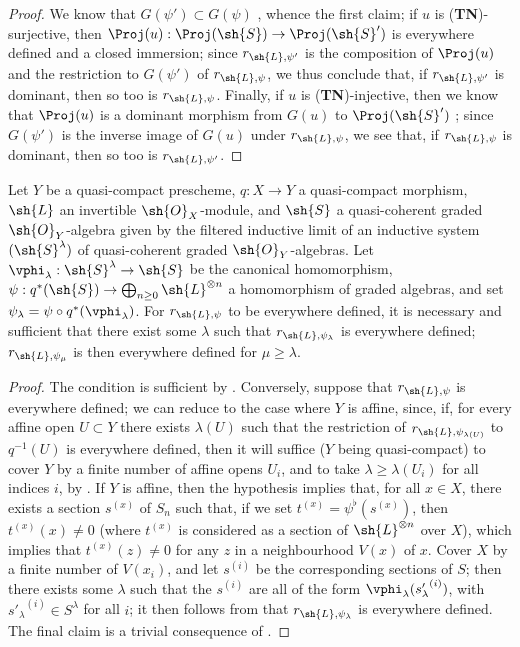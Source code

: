 \begin{proof}
We know that $G(\psi')\subset G(\psi)$ , whence the first claim;
if $u$ is (\textbf{TN})-surjective, then $\Proj(u):\Proj(\sh{S})\to\Proj(\sh{S}')$ is everywhere defined and a closed immersion;
since $r_{\sh{L},\psi'}$ is the composition of $\Proj(u)$ and the restriction to $G(\psi')$ of $r_{\sh{L},\psi}$, we thus conclude that, if $r_{\sh{L},\psi'}$ is dominant, then so too is $r_{\sh{L},\psi}$.
Finally, if $u$ is (\textbf{TN})-injective, then we know that $\Proj(u)$ is a dominant morphism from $G(u)$ to $\Proj(\sh{S}')$ ;
since $G(\psi')$ is the inverse image of $G(u)$ under $r_{\sh{L},\psi}$, we see that, if $r_{\sh{L},\psi}$ is dominant, then so too is $r_{\sh{L},\psi'}$.
\end{proof}

\begin{proposition}[3.7.7]
\label{II.3.7.7}
Let $Y$ be a quasi-compact prescheme, $q:X\to Y$ a quasi-compact morphism, $\sh{L}$ an invertible $\sh{O}_X$-module, and $\sh{S}$ a quasi-coherent graded $\sh{O}_Y$-algebra given by the filtered inductive limit of an inductive system $(\sh{S}^\lambda)$ of quasi-coherent graded $\sh{O}_Y$-algebras.
Let $\vphi_\lambda:\sh{S}^\lambda\to\sh{S}$ be the canonical homomorphism, $\psi:q^*(\sh{S})\to\bigoplus_{n\geq0}\sh{L}^{\otimes n}$ a homomorphism of graded algebras, and set $\psi_\lambda=\psi\circ q^*(\vphi_\lambda)$.
For $r_{\sh{L},\psi}$ to be everywhere defined, it is necessary and sufficient that there exist some $\lambda$ such that $r_{\sh{L},\psi_\lambda}$ is everywhere defined;
$r_{\sh{L},\psi_\mu}$ is then everywhere defined for $\mu\geq\lambda$.
\end{proposition}

\begin{proof}
The condition is sufficient by .
Conversely, suppose that $r_{\sh{L},\psi}$ is everywhere defined;
we can reduce to the case where $Y$ is affine, since, if, for every affine open $U\subset Y$ there exists $\lambda(U)$ such that the restriction of $r_{\sh{L},\psi_{\lambda(U)}}$ to $q^{-1}(U)$ is everywhere defined, then it will suffice ($Y$ being quasi-compact) to cover $Y$ by a finite number of affine opens $U_i$, and to take $\lambda\geq\lambda(U_i)$ for all indices $i$, by .
If $Y$ is affine, then the hypothesis implies that, for all $x\in X$, there exists a section $s^{(x)}$ of $S_n$ such that, if we set $t^{(x)}=\psi^\flat(s^{(x)})$, then $t^{(x)}(x)\neq0$ (where $t^{(x)}$ is considered as a section of $\sh{L}^{\otimes n}$ over $X$), which implies that $t^{(x)}(z)\neq0$ for any $z$ in a neighbourhood $V(x)$ of $x$.
Cover $X$ by a finite number of $V(x_i)$, and let $s^{(i)}$ be the corresponding sections of $S$;
then there exists some $\lambda$ such that the $s^{(i)}$ are all of the form $\vphi_\lambda({s'_\lambda}^{(i)})$, with ${s'_\lambda}^{(i)}\in S^\lambda$ for all $i$;
it then follows from  that $r_{\sh{L},\psi_\lambda}$ is everywhere defined.
The final claim is a trivial consequence of .
\end{proof}

